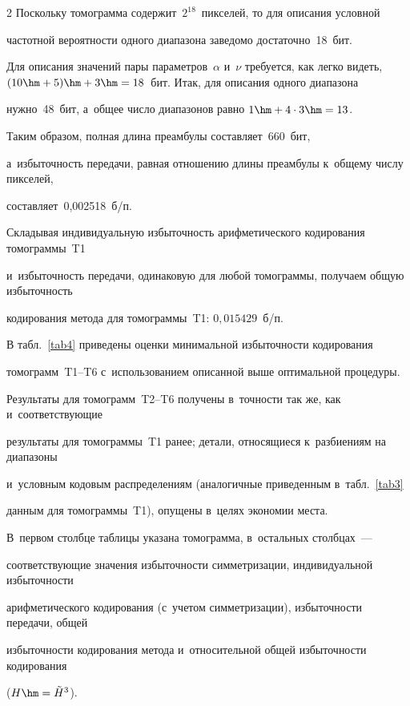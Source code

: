 \begin{multicols}{2}
 Поскольку томограмма содержит~$2^{18}$~пикселей, то для описания условной 

 частотной вероятности одного диапазона заведомо достаточно~18~бит. 

 Для описания значений пары параметров~$\alpha$  и~$\nu$  требуется, как  легко видеть, $(10\hm+5)\hm+3\hm= 18$~бит. Итак, для описания одного диапазона 

 нужно~48~бит, а~общее число диапазонов равно $1\hm+4\cdot 3\hm=13$. 

 Таким образом, полная длина преамбулы составляет~660~бит, 

 а~избыточность передачи, равная отношению длины преамбулы к~общему числу пикселей, 

 составляет~0,002518~б/п.



Складывая индивидуальную избыточность арифметического кодирования томограммы~T1 

и~избыточность передачи, одинаковую для любой томограммы, получаем общую избыточность 

кодирования метода для томограммы~T1: $0{,}015429$~б/п.



В табл.~\ref{tab4} приведены оценки минимальной избыточности кодирования 

томограмм~T1--T6 с~использованием описанной выше оптимальной процеду\-ры. 

Результаты для томограмм~T2--T6 получены в~точности так же, как и~соответствующие 

результаты для томограммы~T1 ранее; детали, относящиеся к~разбиениям на диапазоны 

и~условным кодовым распределениям (аналогичные приведенным в~табл.~\ref{tab3} 

данным для томограммы~T1), опущены в~целях экономии места. 

В~первом столбце таблицы указана томограмма, в~остальных столбцах~--- 

соответствующие значения избыточности сим\-мет\-ри\-за\-ции, индивидуальной избыточности 

арифметического кодирования (с~учетом сим\-мет\-ри\-за\-ции), избыточности передачи, общей 

избыточности кодирования метода и~относительной общей избыточности кодирования 

($H\hm=\tilde{H}^3$).






\end{multicols}
